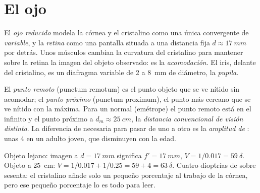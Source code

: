 \section{El ojo}

\begin{definition}\label{def:b1:optical-instruments:eye}
El \emph{ojo reducido} modela la córnea y el cristalino como una única
 convergente de  \emph{variable}, y la
\emph{retina} como una pantalla situada a una distancia fija
$d \approx \qty{17}{mm}$ por detrás. Unos músculos cambian la curvatura
del cristalino para mantener sobre la retina la imagen del objeto
observado: es la \emph{acomodación}. El iris, delante del cristalino, es
un diafragma variable de \qty{2}{} a \qty{8}{mm} de diámetro, la
\emph{pupila}.
\end{definition}

\begin{definition}\label{def:b1:optical-instruments:punctum}
El \emph{punto remoto} (punctum remotum) es el punto objeto que se ve
nítido sin acomodar; el \emph{punto próximo} (punctum proximum), el punto
más cercano que se ve nítido con la  máxima. Para un  normal
(emétrope) el punto remoto está en el infinito y el punto próximo a
$d_m \approx \qty{25}{cm}$, la \emph{distancia convencional de visión
distinta}. La diferencia de  necesaria para pasar de uno a otro
es la \emph{amplitud de }: unas \qty{4}{\delta} en un adulto
joven, que disminuyen con la edad.
\end{definition}

\begin{example}\label{ex:b1:optical-instruments:vergence}
Objeto lejano: imagen a $d = \qty{17}{mm}$ significa $f' = \qty{17}{mm}$,
$V = 1/0.017 = \qty{59}{\delta}$. Objeto a \qty{25}{cm}:
$V = 1/0.017 + 1/0.25 = 59 + 4 = \qty{63}{\delta}$. Cuatro dioptrías de
 sobre sesenta: el cristalino añade solo un pequeño porcentaje
al trabajo de la córnea, pero ese pequeño porcentaje lo es todo para leer.
\end{example}

